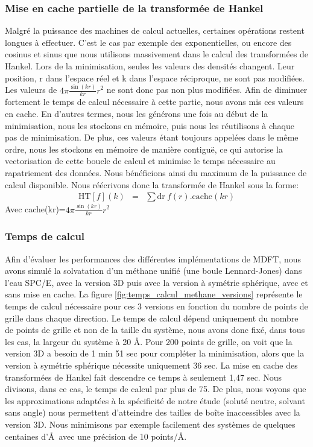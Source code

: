 \subsubsection{Mise en cache partielle de la transformée de Hankel}
Malgré la puissance des machines de calcul actuelles, certaines opérations restent longues à effectuer. C'est le cas par exemple des exponentielles, ou encore des cosinus et sinus que nous utilisons massivement dans le calcul des transformées de Hankel.
Lors de la minimisation, seules les valeurs des densités changent. Leur position, r dans l'espace réel et k dans l'espace réciproque, ne sont pas modifiées. Les valeurs de $4\pi\frac{\sin(kr)}{kr}r^2$ ne sont donc pas non plus modifiées. Afin de diminuer fortement le temps de calcul nécessaire à cette partie, nous avons mis ces valeurs en cache. En d'autres termes, nous les générons une fois au début de la minimisation, nous les stockons en mémoire, puis nous les réutilisons à chaque pas de minimisation. De plus, ces valeurs étant toujours appelées dans le même ordre, nous les stockons en mémoire de manière contiguë, ce qui autorise la vectorisation de cette boucle de calcul et minimise le temps nécessaire au rapatriement des données. Nous bénéficions ainsi du maximum de la puissance de calcul disponible. Nous réécrivons donc la transformée de Hankel sous la forme:
\begin{eqnarray}
\mathrm{HT}[f](k) &=& \sum \mathrm{dr}\ f(r) . \mathrm{cache}(kr)
\end{eqnarray}
Avec cache(kr)=$4\pi\frac{\sin(kr)}{kr}r^2$


\subsubsection{Temps de calcul}
Afin d'évaluer les performances des différentes implémentations de MDFT, nous avons simulé la solvatation d'un méthane unifié (une boule Lennard-Jones) dans l'eau SPC/E, avec la version 3D puis avec la version à symétrie sphérique, avec et sans mise en cache.
La figure \ref{fig:temps_calcul_methane_versions} représente le temps de calcul nécessaire pour ces 3 versions en fonction du nombre de points de grille dans chaque direction.
Le temps de calcul dépend uniquement du nombre de points de grille et non de la taille du système, nous avons donc fixé, dans tous les cas, la largeur du système à 20 \AA.
Pour 200 points de grille, on voit que la version 3D a besoin de 1 min 51 sec pour compléter la minimisation, alors que la version à symétrie sphérique nécessite uniquement 36 sec.
La mise en cache des transformées de Hankel fait descendre ce temps à seulement 1,47 sec.
Nous divisons, dans ce cas, le temps de calcul par plus de 75.
De plus, nous voyons que les approximations adaptées à la spécificité de notre étude (soluté neutre, solvant sans angle) nous permettent d'atteindre des tailles de boîte inaccessibles avec la version 3D.
Nous minimisons par exemple facilement des systèmes de quelques centaines d'\AA\ avec une précision de 10 points/\AA.



